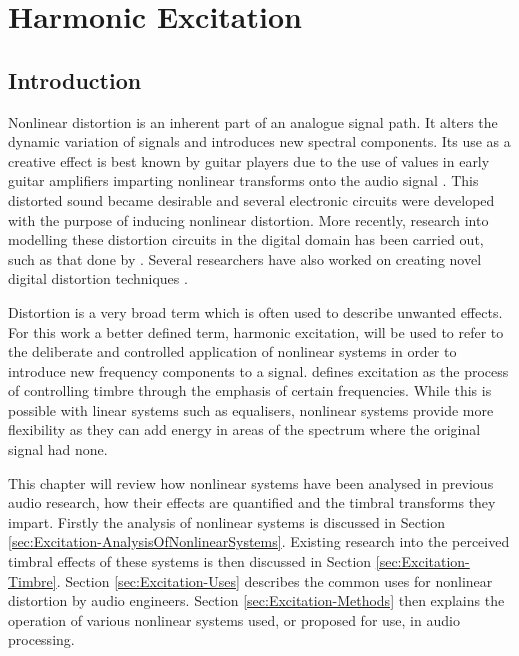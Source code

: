 \chapter{Harmonic Excitation}
\label{chap:Excitation}

\section{Introduction}
\label{sec:Excitation-Introduction}
	Nonlinear distortion is an inherent part of an analogue signal path. It alters the dynamic variation of signals and
	introduces new spectral components. Its use as a creative effect is best known by guitar players due to the use of
	values in early guitar amplifiers imparting nonlinear transforms onto the audio signal
	\citep{dutilleux2011nonlinear}. This distorted sound became desirable and several electronic circuits were developed
	with the purpose of inducing nonlinear distortion. More recently, research into modelling these distortion circuits
	in the digital domain has been carried out, such as that done by \citet{pakarinen2009a}. Several researchers have
	also worked on creating novel digital distortion techniques \citep{fernandez-cid2001distortion, puckette2007patch,
	pekonen2008coefficient}.

	Distortion is a very broad term which is often used to describe unwanted effects. For this work a better defined
	term, harmonic excitation, will be used to refer to the deliberate and controlled application of nonlinear systems
	in order to introduce new frequency components to a signal. \citet{dutilleux2011nonlinear} defines excitation as the
	process of controlling timbre through the emphasis of certain frequencies. While this is possible with linear
	systems such as equalisers, nonlinear systems provide more flexibility as they can add energy in areas of the
	spectrum where the original signal had none.

	This chapter will review how nonlinear systems have been analysed in previous audio research, how their effects are
	quantified and the timbral transforms they impart. Firstly the analysis of nonlinear systems is discussed in Section
	\ref{sec:Excitation-AnalysisOfNonlinearSystems}. Existing research into the perceived timbral effects of these
	systems is then discussed in Section \ref{sec:Excitation-Timbre}. Section \ref{sec:Excitation-Uses} describes the
	common uses for nonlinear distortion by audio engineers. Section \ref{sec:Excitation-Methods} then explains the
	operation of various nonlinear systems used, or proposed for use, in audio processing.

